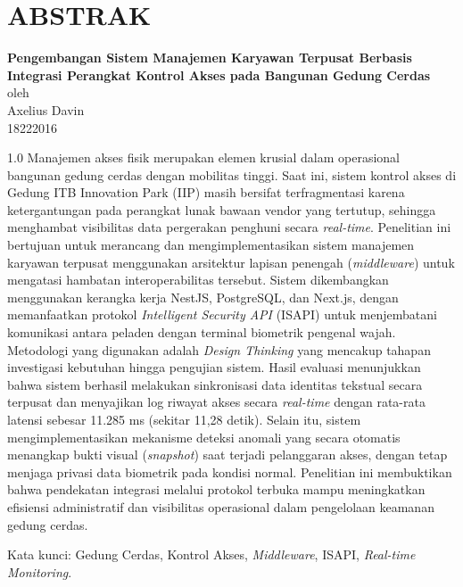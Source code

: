 \chapter*{ABSTRAK}

\begin{center}
    \textbf{Pengembangan Sistem Manajemen Karyawan Terpusat Berbasis Integrasi Perangkat Kontrol Akses pada Bangunan Gedung Cerdas} \\
    \vspace{0.4cm}
    oleh \\
    \vspace{0.4cm}
    Axelius Davin\\
    18222016\\
\end{center}

\begin{spacing}{1.0}
Manajemen akses fisik merupakan elemen krusial dalam operasional bangunan gedung cerdas dengan mobilitas tinggi. Saat ini, sistem kontrol akses di Gedung ITB Innovation Park (IIP) masih bersifat terfragmentasi karena ketergantungan pada perangkat lunak bawaan vendor yang tertutup, sehingga menghambat visibilitas data pergerakan penghuni secara \textit{real-time}. Penelitian ini bertujuan untuk merancang dan mengimplementasikan sistem manajemen karyawan terpusat menggunakan arsitektur lapisan penengah (\textit{middleware}) untuk mengatasi hambatan interoperabilitas tersebut. Sistem dikembangkan menggunakan kerangka kerja NestJS, PostgreSQL, dan Next.js, dengan memanfaatkan protokol \textit{Intelligent Security API} (ISAPI) untuk menjembatani komunikasi antara peladen dengan terminal biometrik pengenal wajah. Metodologi yang digunakan adalah \textit{Design Thinking} yang mencakup tahapan investigasi kebutuhan hingga pengujian sistem. Hasil evaluasi menunjukkan bahwa sistem berhasil melakukan sinkronisasi data identitas tekstual secara terpusat dan menyajikan log riwayat akses secara \textit{real-time} dengan rata-rata latensi sebesar 11.285 ms (sekitar 11,28 detik). Selain itu, sistem mengimplementasikan mekanisme deteksi anomali yang secara otomatis menangkap bukti visual (\textit{snapshot}) saat terjadi pelanggaran akses, dengan tetap menjaga privasi data biometrik pada kondisi normal. Penelitian ini membuktikan bahwa pendekatan integrasi melalui protokol terbuka mampu meningkatkan efisiensi administratif dan visibilitas operasional dalam pengelolaan keamanan gedung cerdas.

Kata kunci: Gedung Cerdas, Kontrol Akses, \textit{Middleware}, ISAPI, \textit{Real-time Monitoring}.
\end{spacing}
